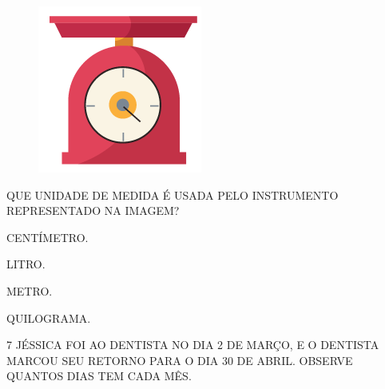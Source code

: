 \begin{figure}[H]
\centering
\includegraphics[width=\textwidth]{./media/SAEB_1ANO_MAT_FIGURA123.png}
\end{figure}

QUE UNIDADE DE MEDIDA É USADA PELO INSTRUMENTO REPRESENTADO NA IMAGEM?

\begin{escolha}[itemsep=0pt]
\item CENTÍMETRO.

\item LITRO.

\item METRO.

\item QUILOGRAMA.
\end{escolha}

\pagebreak
\num{7} JÉSSICA FOI AO DENTISTA NO DIA 2 DE MARÇO, E O DENTISTA MARCOU SEU
RETORNO PARA O DIA 30 DE ABRIL. OBSERVE QUANTOS DIAS TEM CADA MÊS.

